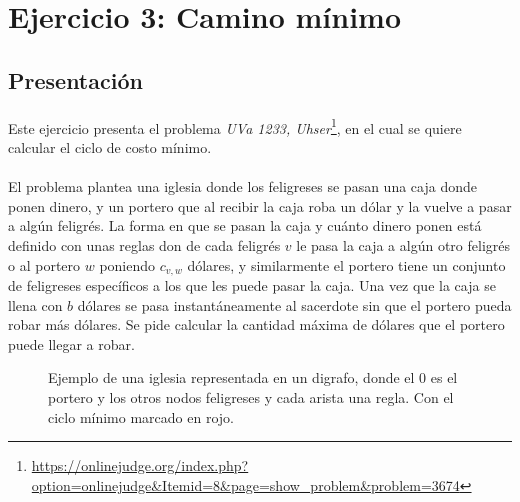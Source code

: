 \documentclass[../main.tex]{subfiles}
\begin{document}
\section{Ejercicio 3: Camino mínimo}

\subsection{Presentación}
\label{sec:ej3-intro}
\paragraph{} Este ejercicio presenta el problema \textit{UVa 1233, Uhser}\footnote{\url{https://onlinejudge.org/index.php?option=onlinejudge&Itemid=8&page=show_problem&problem=3674}}, en el cual se quiere calcular el ciclo de costo mínimo.

\paragraph{} El problema plantea una iglesia donde los feligreses se pasan una caja donde ponen dinero, y un portero que al recibir la caja roba un dólar y la vuelve a pasar a algún feligrés. La forma en que se pasan la caja y cuánto dinero ponen está definido con unas reglas don de cada feligrés \(v\) le pasa la caja a algún otro feligrés o al portero \(w\) poniendo \(c_{v,w}\) dólares, y similarmente el portero tiene un conjunto de feligreses específicos a los que les puede pasar la caja. Una vez que la caja se llena con \(b\) dólares se pasa instantáneamente al sacerdote sin que el portero pueda robar más dólares. Se pide calcular la cantidad máxima de dólares que el portero puede llegar a robar.

\begin{figure}[H]
\centering


\caption{Ejemplo de una iglesia representada en un digrafo, donde el 0 es el portero y los otros nodos feligreses y cada arista una regla. Con el ciclo mínimo marcado en rojo.}
\label{fig:ej3-ex}
\end{figure}
\end{document}
